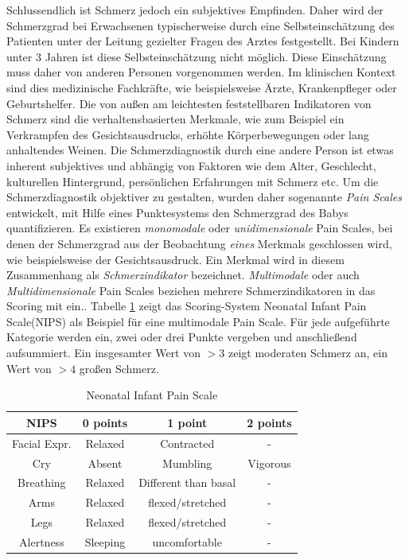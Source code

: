 Schlussendlich ist Schmerz jedoch ein subjektives Empfinden. Daher wird der Schmerzgrad bei Erwachsenen typischerweise durch eine Selbsteinschätzung des Patienten unter der Leitung gezielter Fragen des Arztes festgestellt. Bei Kindern unter 3 Jahren ist diese Selbsteinschätzung nicht möglich. Diese Einschätzung muss daher von anderen Personen vorgenommen werden. Im klinischen Kontext sind dies medizinische Fachkräfte, wie beispielsweise Ärzte, Krankenpfleger oder Geburtshelfer. Die von außen am leichtesten feststellbaren Indikatoren von Schmerz sind die verhaltensbasierten Merkmale, wie zum Beispiel ein Verkrampfen des Gesichtsausdrucks, erhöhte Körperbewegungen oder lang anhaltendes Weinen.\cite[S. 438]{PainAssessment01} Die Schmerzdiagnostik durch eine andere Person ist etwas inherent subjektives und abhängig von Faktoren wie dem Alter, Geschlecht, kulturellen Hintergrund, persönlichen Erfahrungen mit Schmerz etc.\cite[S. 3]{overview} Um die Schmerzdiagnostik objektiver zu gestalten, wurden daher sogenannte \emph{Pain Scales} entwickelt, mit Hilfe eines Punktesystems den Schmerzgrad des Babys quantifizieren.\cite[S. 438 - 439]{PainAssessment01} Es existieren \emph{monomodale} oder \emph{unidimensionale} Pain Scales, bei denen der Schmerzgrad aus der Beobachtung \emph{eines} Merkmals geschlossen wird, wie beispielsweise der Gesichtsausdruck. Ein Merkmal wird in diesem Zusammenhang als \emph{Schmerzindikator} bezeichnet. \emph{ Multimodale} oder auch \emph{Multidimensionale} Pain Scales beziehen mehrere Schmerzindikatoren in das Scoring mit ein.\cite[S. 69 - 71]{PainAssessment02}. Tabelle \ref{tab:nips} zeigt das Scoring-System \glqq Neonatal Infant Pain Scale\grqq{}(NIPS) als Beispiel für eine multimodale Pain Scale. Für jede aufgeführte Kategorie werden ein, zwei oder drei Punkte vergeben und anschließend aufsummiert. Ein insgesamter Wert von $>3$ zeigt moderaten Schmerz an, ein Wert von $>4$ großen Schmerz.\cite{nips}

\begin{table}[h]
	\footnotesize
	\centering
	\caption{Neonatal Infant Pain Scale \cite{nips}}
	\label{tab:nips}
	\begin{tabular}{@{}cccc@{}}
		\toprule
		\textbf{NIPS}     & \textbf{0 points} & \textbf{1 point}     & \textbf{2 points} \\ \midrule
		Facial Expr. & Relaxed           & Contracted           & -                 \\
		Cry               & Absent            & Mumbling             & Vigorous          \\
		Breathing         & Relaxed           & Different than basal & -                 \\
		Arms              & Relaxed           & flexed/stretched     & -                 \\
		Legs              & Relaxed           & flexed/stretched     & -                 \\
		Alertness         & Sleeping          & uncomfortable        & -                 \\ \bottomrule
	\end{tabular}
\end{table}


